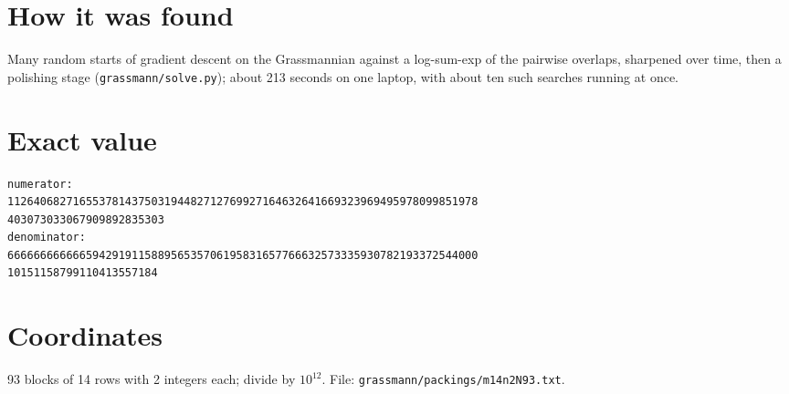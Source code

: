 \documentclass[11pt,a4paper]{article}
\begin{document}
\section{How it was found}
Many random starts of gradient descent on the Grassmannian against a log-sum-exp of the pairwise overlaps, sharpened over time, then a polishing stage (\texttt{grassmann/solve.py}); about 213 seconds on one laptop, with about ten such searches running at once.


\appendix
\section{Exact value}
{\small
\begin{verbatim}
numerator:
112640682716553781437503194482712769927164632641669323969495978099851978
403073033067909892835303
denominator:
666666666666594291911588956535706195831657766632573335930782193372544000
10151158799110413557184
\end{verbatim}}

\section{Coordinates}
93 blocks of 14 rows with 2 integers each; divide by $10^{12}$. File: \texttt{grassmann/packings/m14n2N93.txt}.
{\tiny
\begin{multicols}{4}
\end{multicols}}
\end{document}
